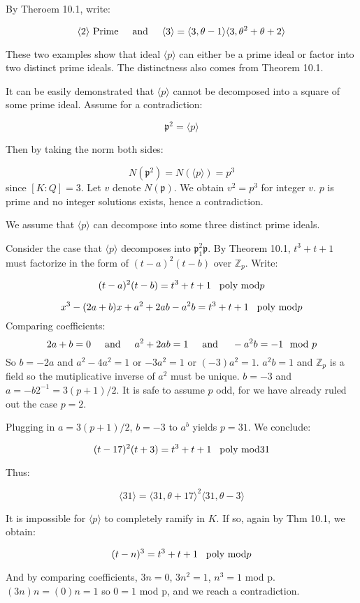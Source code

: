 \documentclass{article}
\def\ZZ{{\mathbb{Z}}}
\def\contradiction{{\lightning}}
\newcommand{\textAnd}{
    \hspace{5mm}
    \textrm{and}
    \hspace{5mm}
}
\newcommand{\polymod}{
    \hspace{3mm}
    \textrm{poly mod}
}
\newcommand{\<}{{{
    \langle
}}}
\def\>{{{
    \rangle
}}}
\def\ZZ{{\mathbb{Z}}}
\newcommand{\pideal}{
    {{\mathfrak{p}}}
}
\begin{document}
By Theroem 10.1, write:

\[
    \<2\> \textrm{   Prime}
    \textAnd 
    \<3\> = \<3, \theta - 1\>\<3, \theta^2 + \theta + 2\>
\]

These two examples show that ideal $\<p\>$
can either be a prime ideal or factor into two distinct prime ideals. 
The distinctness also comes from Theorem 10.1. 

It can be easily demonstrated that $\<p\>$ cannot be decomposed into a 
square of some prime ideal. Assume for a contradiction:

\[
    \pideal^2 = \<p\>
\]

Then by taking the norm both sides:

\[
    N(\pideal^2) = N(\<p\>) = p^3
\]
since $[K:Q] = 3$. Let $v$ denote $N(\pideal)$. We obtain $v^2 = p^3$ 
for integer $v$. $p$ is prime and no integer solutions exists, hence a 
contradiction. \contradiction

We assume that $\<p\>$ can decompose into some three distinct 
prime ideals. 

Consider the case that $\<p\>$ decomposes 
into $\pideal_1^2\pideal$. By Theorem 10.1, $t^3+t+1$ must factorize 
in the form of $(t-a)^2(t-b)$ over $\ZZ_p$. 
Write:

\[
    (t-a)^2(t-b) = t^3 +t+1 \polymod p
\]

\[
    x^3-(2a+b)x+a^2+2ab-a^2b = t^3 + t + 1 \polymod p 
\]
Comparing coefficients:
\[
    2a + b = 0 \textAnd a^2+2ab=1 \textAnd -a^2b = -1 \mod p
\]
So $b=-2a$ and $a^2 - 4a^2 = 1$ or $-3a^2 = 1$ or $(-3)a^2 = 1$. 
$a^2b = 1$ and $\ZZ_p$ is a field so the mutiplicative inverse of 
$a^2$ must be unique. $b = -3$ and $a = -b2^{-1} = 3(p+1)/2$. It 
is safe to assume $p$ odd, for we have already ruled out the 
case $p = 2$. 

Plugging in $a = 3(p+1)/2$, $b = -3$ to $a^b$ yields $p = 31$. 
We conclude:

\[
    (t-17)^2(t+3) = t^3+t+1 \polymod 31
\]

Thus:

\[
    \<31\> = \<31, \theta +17\>^2\<31, \theta -3\>
\]

It is impossible for $\<p\>$ to completely ramify in $K$. If so, again 
by Thm 10.1, we obtain:

\[
    (t-n)^3 = t^3+t+1 \polymod p 
\]

And by comparing coefficients, $3n = 0$, $3n^2=1$, $n^3 = 1$ mod p. 
$(3n)n = (0)n = 1$ so $0 = 1$ mod p, and we reach a contradiction. 
\end{document}
